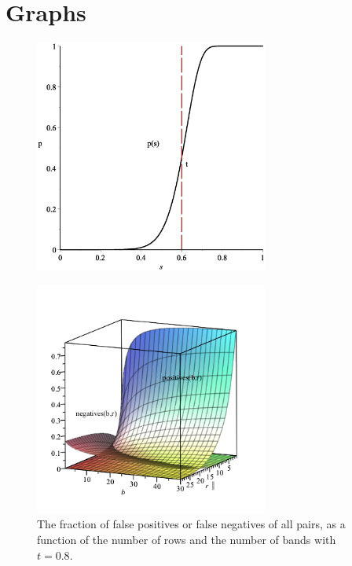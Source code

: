 \section{Graphs}\label{sec:graph}
\begin{figure}[H]
	\includegraphics[width=290px]{img/pGraphGood.eps}
	\label{fig:p_graph_good}
\end{figure}
\begin{figure}[H]
	\includegraphics[width=290px]{img/falseGraph2.png}
\caption{The fraction of false positives or false negatives of all pairs, as a function of the number of rows and the number of bands with \(t=0.8\).}
\end{figure}
